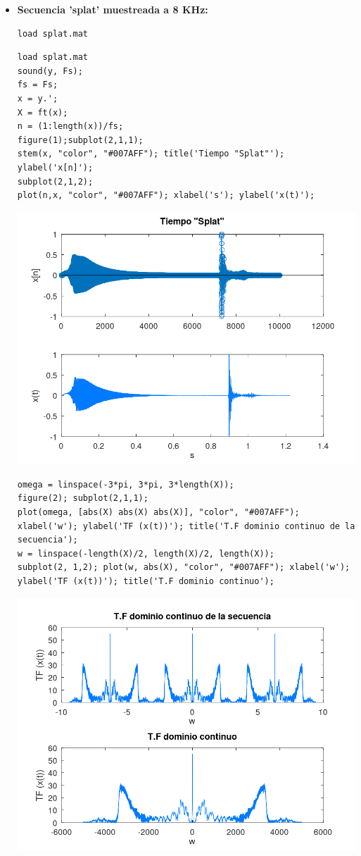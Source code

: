 \documentclass{article}
\begin{document}
\begin{itemize}
\item \textbf{Secuencia 'splat' muestreada a 8 KHz:} 
\begin{lstlisting}
load splat.mat
\end{lstlisting}

\begin{lstlisting}
load splat.mat
sound(y, Fs);
fs = Fs;
x = y.';
X = ft(x);
n = (1:length(x))/fs;
figure(1);subplot(2,1,1);
stem(x, "color", "#007AFF"); title('Tiempo "Splat"'); ylabel('x[n]');
subplot(2,1,2);
plot(n,x, "color", "#007AFF"); xlabel('s'); ylabel('x(t)');
\end{lstlisting}

\begin{center}
\includegraphics[width=0.7\linewidth]{Imágenes/Figura1}
\end{center}

\begin{lstlisting}
omega = linspace(-3*pi, 3*pi, 3*length(X));
figure(2); subplot(2,1,1);
plot(omega, [abs(X) abs(X) abs(X)], "color", "#007AFF"); xlabel('w'); ylabel('TF (x(t))'); title('T.F dominio continuo de la secuencia');
w = linspace(-length(X)/2, length(X)/2, length(X));
subplot(2, 1,2); plot(w, abs(X), "color", "#007AFF"); xlabel('w'); ylabel('TF (x(t))'); title('T.F dominio continuo');
\end{lstlisting}

\begin{center}
\includegraphics[width=0.7\linewidth]{Imágenes/Figura2}
\end{center}


\end{itemize}
\end{document}
